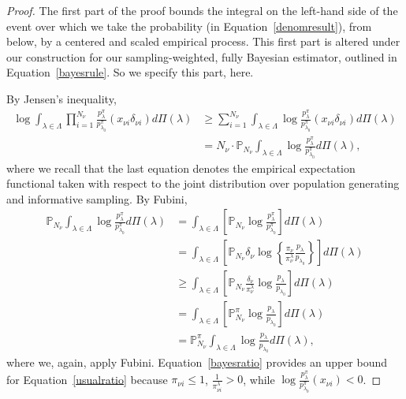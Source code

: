 \documentclass[]{imsart}
\begin{document}
\begin{proof}\label{AppDenominator}
The first part of the proof bounds the integral on the left-hand side of the event over which we take the probability   (in Equation~\eqref{denomresult}), from below, by a centered and scaled empirical process.  This first part is altered under our construction for our sampling-weighted, fully Bayesian estimator, outlined in Equation~\eqref{bayesrule}. So we specify this part, here.


By Jensen's inequality,
\begin{align*}
\log\mathop{\int}_{\lambda\in\Lambda}\mathop{\prod}_{i=1}^{N_{\nu}}\frac{p_{\lambda}^{\pi}}{p_{\lambda_{0}}^{\pi}}\left(x_{\nu i}\delta_{\nu i}\right)d\Pi\left(\lambda\right) &\geq \mathop{\sum}_{i=1}^{N_{\nu}}\displaystyle\mathop{\int}_{\lambda\in\Lambda}\log\frac{p_{\lambda}^{\pi}}{p_{\lambda_{0}}^{\pi}}\left(x_{\nu i}\delta_{\nu i}\right)d\Pi\left(\lambda\right)\\
&= N_{\nu}\cdot\mathbb{P}_{N_{\nu}}\mathop{\int}_{\lambda\in\Lambda}\log\frac{p_{\lambda}^{\pi}}{p_{\lambda_{0}}^{\pi}}d\Pi\left(\lambda\right),
\end{align*}
where we recall that the last equation denotes the empirical expectation functional taken with respect to the joint distribution over population generating and informative sampling.  By Fubini,
\begin{align}
\mathbb{P}_{N_{\nu}}\mathop{\int}_{\lambda\in\Lambda}\log\frac{p_{\lambda}^{\pi}}{p_{\lambda_{0}}^{\pi}}d\Pi\left(\lambda\right)
&= \mathop{\int}_{\lambda\in\Lambda}\left[\mathbb{P}_{N_{\nu}}\log\frac{p_{\lambda}^{\pi}}{p_{\lambda_{0}}^{\pi}}\right]d\Pi\left(\lambda\right)\\
&= \mathop{\int}_{\lambda\in\Lambda}\left[\mathbb{P}_{N_{\nu}}\delta_{\nu}
\log\left\{\frac{\pi_{\nu}}{\pi_{\nu }^{\lambda}}\frac{p_{\lambda}}{p_{\lambda_{0}}}\right\}\right]d\Pi\left(\lambda\right)\label{bayesratio}\\
&\geq \mathop{\int}_{\lambda\in\Lambda}\left[\mathbb{P}_{N_{\nu}}\frac{\delta_{\nu}}{\pi_{\nu}^{\lambda}}
\log\frac{p_{\lambda}}{p_{\lambda_{0}}}\right]d\Pi\left(\lambda\right)\label{usualratio}\\
&= \mathop{\int}_{\lambda\in\Lambda}\left[\mathbb{P}^{\pi}_{N_{\nu}}
\log\frac{p_{\lambda}}{p_{\lambda_{0}}}\right]d\Pi\left(\lambda\right)\\
&= \mathbb{P}^{\pi}_{N_{\nu}}\mathop{\int}_{\lambda\in\Lambda}\log\frac{p_{\lambda}}{p_{\lambda_{0}}}d\Pi\left(\lambda\right),
\end{align}
where we, again, apply Fubini.  Equation~\eqref{bayesratio} provides an upper bound for Equation~\eqref{usualratio} because $\pi_{\nu i} \leq 1$, $\frac{1}{\pi_{\nu i}^{\lambda}} > 0$, while $\log\frac{p_{\lambda}^{\pi}}{p_{\lambda_{0}}^{\pi}}(x_{\nu i}) < 0$.


\end{proof}
\end{document}
